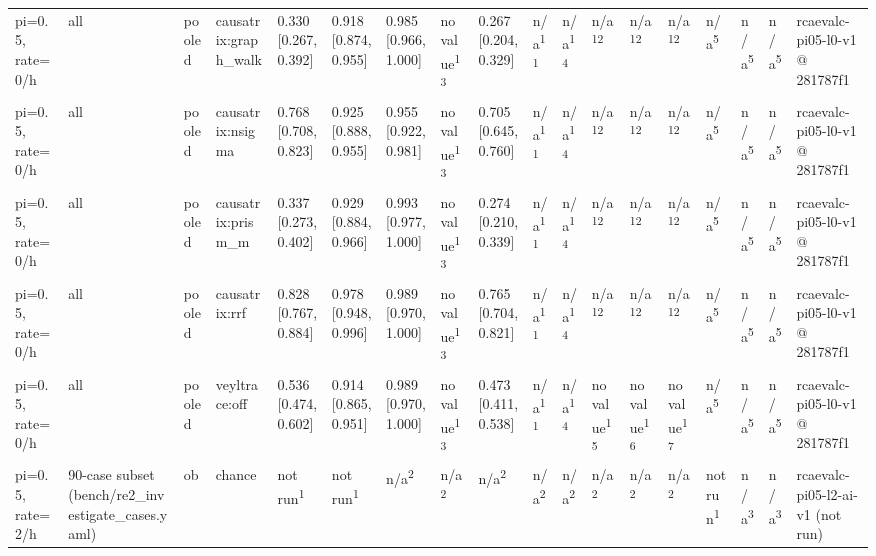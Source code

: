 \begin{table}[t]
\begin{tabular}{llllllllllllllllll}
pi=0.5, rate=0/h & all & pooled & causatrix:graph\_walk & 0.330 [0.267, 0.392] & 0.918 [0.874, 0.955] & 0.985 [0.966, 1.000] & no value\textsuperscript{13} & 0.267 [0.204, 0.329] & n/a\textsuperscript{11} & n/a\textsuperscript{14} & n/a\textsuperscript{12} & n/a\textsuperscript{12} & n/a\textsuperscript{12} & n/a\textsuperscript{5} & n/a\textsuperscript{5} & n/a\textsuperscript{5} & rcaevalc-pi05-l0-v1 @ 281787f1 \\
pi=0.5, rate=0/h & all & pooled & causatrix:nsigma & 0.768 [0.708, 0.823] & 0.925 [0.888, 0.955] & 0.955 [0.922, 0.981] & no value\textsuperscript{13} & 0.705 [0.645, 0.760] & n/a\textsuperscript{11} & n/a\textsuperscript{14} & n/a\textsuperscript{12} & n/a\textsuperscript{12} & n/a\textsuperscript{12} & n/a\textsuperscript{5} & n/a\textsuperscript{5} & n/a\textsuperscript{5} & rcaevalc-pi05-l0-v1 @ 281787f1 \\
pi=0.5, rate=0/h & all & pooled & causatrix:prism\_m & 0.337 [0.273, 0.402] & 0.929 [0.884, 0.966] & 0.993 [0.977, 1.000] & no value\textsuperscript{13} & 0.274 [0.210, 0.339] & n/a\textsuperscript{11} & n/a\textsuperscript{14} & n/a\textsuperscript{12} & n/a\textsuperscript{12} & n/a\textsuperscript{12} & n/a\textsuperscript{5} & n/a\textsuperscript{5} & n/a\textsuperscript{5} & rcaevalc-pi05-l0-v1 @ 281787f1 \\
pi=0.5, rate=0/h & all & pooled & causatrix:rrf & 0.828 [0.767, 0.884] & 0.978 [0.948, 0.996] & 0.989 [0.970, 1.000] & no value\textsuperscript{13} & 0.765 [0.704, 0.821] & n/a\textsuperscript{11} & n/a\textsuperscript{14} & n/a\textsuperscript{12} & n/a\textsuperscript{12} & n/a\textsuperscript{12} & n/a\textsuperscript{5} & n/a\textsuperscript{5} & n/a\textsuperscript{5} & rcaevalc-pi05-l0-v1 @ 281787f1 \\
pi=0.5, rate=0/h & all & pooled & veyltrace:off & 0.536 [0.474, 0.602] & 0.914 [0.865, 0.951] & 0.989 [0.970, 1.000] & no value\textsuperscript{13} & 0.473 [0.411, 0.538] & n/a\textsuperscript{11} & n/a\textsuperscript{14} & no value\textsuperscript{15} & no value\textsuperscript{16} & no value\textsuperscript{17} & n/a\textsuperscript{5} & n/a\textsuperscript{5} & n/a\textsuperscript{5} & rcaevalc-pi05-l0-v1 @ 281787f1 \\
pi=0.5, rate=2/h & 90-case subset (bench/re2\_investigate\_cases.yaml) & ob & chance & not run\textsuperscript{1} & not run\textsuperscript{1} & n/a\textsuperscript{2} & n/a\textsuperscript{2} & n/a\textsuperscript{2} & n/a\textsuperscript{2} & n/a\textsuperscript{2} & n/a\textsuperscript{2} & n/a\textsuperscript{2} & n/a\textsuperscript{2} & not run\textsuperscript{1} & n/a\textsuperscript{3} & n/a\textsuperscript{3} & rcaevalc-pi05-l2-ai-v1 (not run) \\

\end{tabular}
\end{table}

